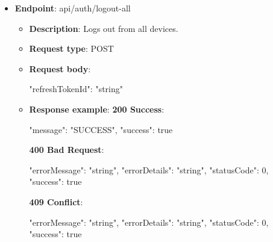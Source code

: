 \begin{itemize}
    \item \textbf{Endpoint}: api/auth/logout-all
    \begin{itemize}
        \item \textbf{Description}: Logs out from all devices.
        \item \textbf{Request type}: POST
        \item \textbf{Request body}:
        \begin{spverbatim}
        {
            "refreshTokenId": "string"
        }
        \end{spverbatim}
        \item  \textbf{Response example}:
        \textbf{200 Success}:
        \begin{spverbatim}
        {
            "message": "SUCCESS",
            "success": true
        }
        \end{spverbatim}
        \textbf{400 Bad Request}:
        \begin{spverbatim}
        {
            "errorMessage": "string",
            "errorDetails": "string",
            "statusCode": 0,
            "success": true
        }
        \end{spverbatim}
        \textbf{409 Conflict}:
        \begin{spverbatim}
        {
            "errorMessage": "string",
            "errorDetails": "string",
            "statusCode": 0,
            "success": true
        }
        \end{spverbatim}
    \end{itemize}

\end{itemize}


